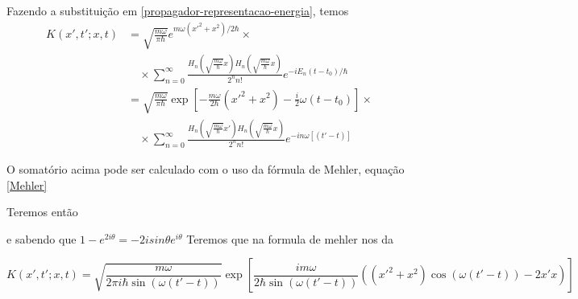 \documentclass{book}
\begin{document}
 Fazendo a substituição em  \eqref{propagador-representacao-energia}, temos
 \begin{align}
 	K(x', t'; x, t) &= \sqrt{\frac{m\omega}{\pi\hbar}} e^{m\omega(x'^2+x^2)/2\hbar} \times \nonumber \\
 	& \quad \times \sum_{n=0}^{\infty} \frac{H_n \left( \sqrt{\frac{m\omega}{\hbar}} x \right) H_n \left( \sqrt{\frac{m\omega}{\hbar}} x \right)}{2^n n!} e^{-iE_n(t-t_0)/\hbar} \nonumber \\
 	&= \sqrt{\frac{m\omega}{\pi\hbar}} \exp \left[- \frac{m\omega}{2\hbar}(x'^2+x^2) - \frac{i}{2}\omega(t-t_0) \right] \times \nonumber \\
 	& \quad \times \sum_{n=0}^{\infty} \frac{H_n \left( \sqrt{\frac{m\omega}{\hbar}} x' \right) H_n \left( \sqrt{\frac{m\omega}{\hbar}} x \right)}{2^n n!} e^{-in\omega[(t'-t)]} 
 \end{align}
 
 O somatório acima pode ser calculado com o uso da fórmula de Mehler, equação \eqref{Mehler}
 
 Teremos então
 
 e sabendo que $1-e^{2i \theta}=-2isin \theta e^{i\theta}$ Teremos que na formula de mehler nos da
 
\begin{equation}
	K(x', t'; x, t) = \sqrt{\frac{m\omega}{2\pi i\hbar \sin(\omega(t'-t))}} \exp \left[ \frac{im\omega}{2\hbar\sin(\omega(t'-t))} \left( (x'^2+x^2)\cos(\omega(t'-t)) - 2x'x \right) \right]
\end{equation}
 
 
 
 
 
 
 
 
 
 
 
 
 
 
 
 
 
 
 
 
 
 
 
 
 
 
 
 
 
 
 
 
 
 
 
 
 
 
 
 
 
\end{document}
